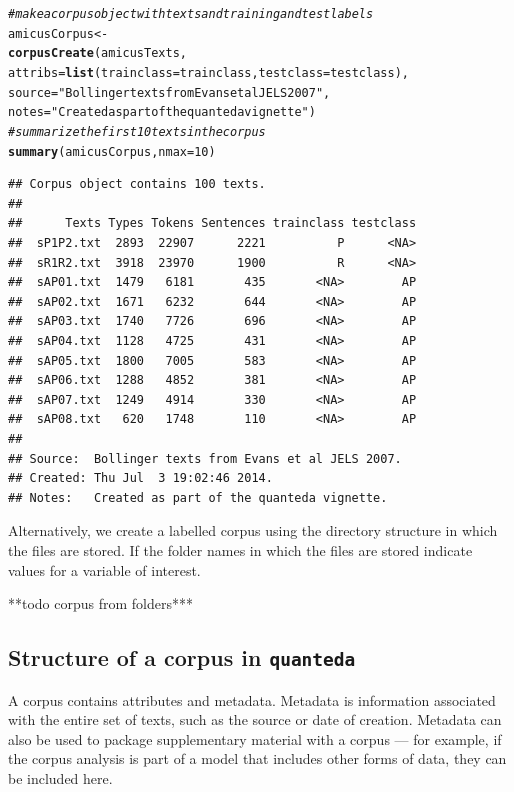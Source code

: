 \documentclass[11pt]{article}\usepackage[]{graphicx}\usepackage[]{color}
\makeatletter
\newcommand{\hlnum}[1]{\textcolor[rgb]{0.686,0.059,0.569}{#1}}%
\newcommand{\hlstr}[1]{\textcolor[rgb]{0.192,0.494,0.8}{#1}}%
\newcommand{\hlcom}[1]{\textcolor[rgb]{0.678,0.584,0.686}{\textit{#1}}}%
\newcommand{\hlstd}[1]{\textcolor[rgb]{0.345,0.345,0.345}{#1}}%
\newcommand{\hlkwb}[1]{\textcolor[rgb]{0.69,0.353,0.396}{#1}}%
\newcommand{\hlkwc}[1]{\textcolor[rgb]{0.333,0.667,0.333}{#1}}%
\newcommand{\hlkwd}[1]{\textcolor[rgb]{0.737,0.353,0.396}{\textbf{#1}}}%
\newenvironment{kframe}{%
 \def\at@end@of@kframe{}%
 \ifinner\ifhmode%
  \def\at@end@of@kframe{\end{minipage}}%
  \begin{minipage}{\columnwidth}%
 \fi\fi%
 \def\FrameCommand##1{\hskip\@totalleftmargin \hskip-\fboxsep
 \colorbox{shadecolor}{##1}\hskip-\fboxsep
     \hskip-\linewidth \hskip-\@totalleftmargin \hskip\columnwidth}%
 \MakeFramed {\advance\hsize-\width
   \@totalleftmargin\z@ \linewidth\hsize
   \@setminipage}}%
 {\par\unskip\endMakeFramed%
 \at@end@of@kframe}
\newenvironment{knitrout}{}{} %
\makeatother
\begin{document}
\begin{knitrout}\footnotesize
{}\color{fgcolor}\begin{kframe}
\begin{alltt}
\hlcom{# make a corpus object with texts and training and test labels}
\hlstd{amicusCorpus} \hlkwb{<-}
  \hlkwd{corpusCreate}\hlstd{(amicusTexts,}
               \hlkwc{attribs} \hlstd{=} \hlkwd{list}\hlstd{(}\hlkwc{trainclass}\hlstd{=trainclass,} \hlkwc{testclass}\hlstd{=testclass),}
               \hlkwc{source} \hlstd{=} \hlstr{"Bollinger texts from Evans et al JELS 2007"}\hlstd{,}
               \hlkwc{notes} \hlstd{=} \hlstr{"Created as part of the quanteda vignette"}\hlstd{)}
\hlcom{# summarize the first 10 texts in the corpus}
\hlkwd{summary}\hlstd{(amicusCorpus,} \hlkwc{nmax}\hlstd{=}\hlnum{10}\hlstd{)}
\end{alltt}
\begin{verbatim}
## Corpus object contains 100 texts.
## 
##      Texts Types Tokens Sentences trainclass testclass
##  sP1P2.txt  2893  22907      2221          P      <NA>
##  sR1R2.txt  3918  23970      1900          R      <NA>
##  sAP01.txt  1479   6181       435       <NA>        AP
##  sAP02.txt  1671   6232       644       <NA>        AP
##  sAP03.txt  1740   7726       696       <NA>        AP
##  sAP04.txt  1128   4725       431       <NA>        AP
##  sAP05.txt  1800   7005       583       <NA>        AP
##  sAP06.txt  1288   4852       381       <NA>        AP
##  sAP07.txt  1249   4914       330       <NA>        AP
##  sAP08.txt   620   1748       110       <NA>        AP
## 
## Source:  Bollinger texts from Evans et al JELS 2007.
## Created: Thu Jul  3 19:02:46 2014.
## Notes:   Created as part of the quanteda vignette.
\end{verbatim}
\end{kframe}
\end{knitrout}

Alternatively, we create a labelled corpus using the directory structure in which the files are stored. If the folder names in which the files are stored indicate values for a variable of interest.

**todo corpus from folders***

\subsection{Structure of a corpus in \texttt{quanteda}}
A corpus contains attributes and metadata. Metadata is information associated with the entire set of texts, such as the source or date of creation. Metadata can also be used to package supplementary material with a corpus --- for example, if the corpus analysis is part of a model that includes other forms of data, they can be included here.
\end{document}
